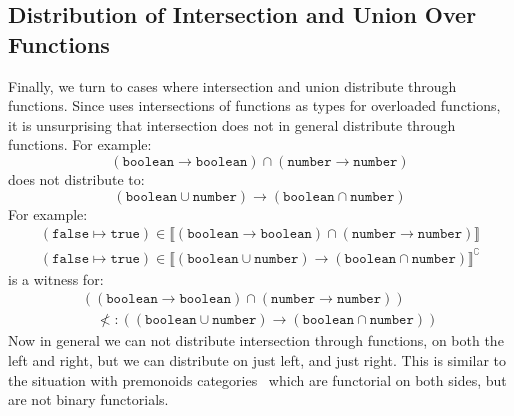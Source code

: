 \documentclass[acmsmall,review,screen]{acmart}
\newcommand{\TRUE}{\mathtt{true}}
\newcommand{\FALSE}{\mathtt{false}}
\newcommand{\BOOLEAN}{\mathtt{boolean}}
\newcommand{\NUMBER}{\mathtt{number}}
\newcommand{\fun}{\mathbin{\rightarrow}}
\newcommand{\sem}[1]{\llbracket{#1}\rrbracket}
\newcommand{\nsem}[1]{\llbracket{#1}\rrbracket^\complement}
\begin{document}
\subsection{Distribution of Intersection and Union Over Functions}

Finally, we turn to cases where intersection and union distribute
through functions. Since  uses intersections of functions as
types for overloaded functions, it is unsurprising that intersection does
not in general distribute through functions. For example:
\[
  (\BOOLEAN\fun\BOOLEAN) \cap (\NUMBER\fun\NUMBER)
\]
does not distribute to:
\[
  (\BOOLEAN\cup\NUMBER)\fun(\BOOLEAN\cap\NUMBER)
\]
For example:
\[\begin{array}{l}
  (\FALSE\mapsto\TRUE) \in \sem{(\BOOLEAN\fun\BOOLEAN) \cap (\NUMBER\fun\NUMBER)} \\
  (\FALSE\mapsto\TRUE) \in \nsem{(\BOOLEAN\cup\NUMBER)\fun(\BOOLEAN\cap\NUMBER)}
\end{array}\]
is a witness for:
\[\begin{array}{l}
  ((\BOOLEAN\fun\BOOLEAN) \cap (\NUMBER\fun\NUMBER)) \\\quad
  \not<:
  ((\BOOLEAN\cup\NUMBER)\fun(\BOOLEAN\cap\NUMBER))
\end{array}\]
Now in general we can not distribute intersection through functions,
on both the left and right, but we can distribute on just left, and just right.
This is similar to the situation with premonoids categories~\cite{??} which
are functorial on both sides, but are not binary functorials.
\end{document}
